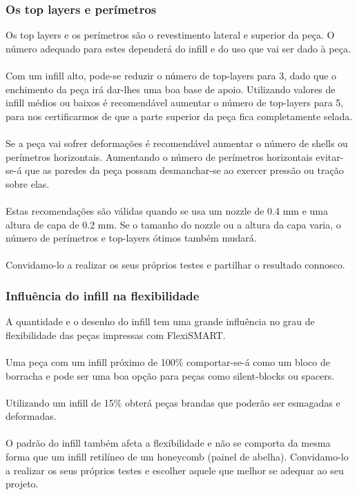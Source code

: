 \documentclass[11pt,a4paper]{article}
\begin{document}
		\subsubsection{Os top layers e perímetros}
Os top layers e os perímetros são o revestimento lateral e superior da peça. O número adequado para estes dependerá do infill e do uso que vai ser dado à peça.
\\\\
Com um infill alto, pode-se reduzir o número de top-layers para 3, dado que o enchimento da peça irá dar-lhes uma boa base de apoio. Utilizando valores de infill médios ou baixos é recomendável aumentar o número de top-layers para 5, para nos certificarmos de que a parte superior da peça fica completamente selada.
\\\\
Se a peça vai sofrer deformações é recomendável aumentar o número de shells ou perímetros horizontais. Aumentando o número de perímetros horizontais evitar-se-á que as paredes da peça possam desmanchar-se ao exercer pressão ou tração sobre elas.
\\\\
Estas recomendações são válidas quando se usa um nozzle de 0.4 mm e uma altura de capa de 0.2 mm. Se o tamanho do nozzle ou a altura da capa varia, o número de perímetros e top-layers ótimos também mudará.
\\\\
Convidamo-lo a realizar os seus próprios testes e partilhar o resultado connosco.
		\subsubsection{Influência do infill na flexibilidade}
A quantidade e o desenho do infill tem uma grande influência no grau de flexibilidade das peças impressas com FlexiSMART.
\\\\
Uma peça com um infill próximo de 100\% comportar-se-á como um bloco de borracha e pode ser uma boa opção para peças como silent-blocks ou spacers.
\\\\
Utilizando um infill de 15\% obterá peças brandas que poderão ser esmagadas e deformadas.
\\\\
O padrão do infill também afeta a flexibilidade e não se comporta da mesma forma que um infill retilíneo de um honeycomb (painel de abelha).  Convidamo-lo a realizar os seus próprios testes e escolher aquele que melhor se adequar ao seu projeto.
\end{document}
